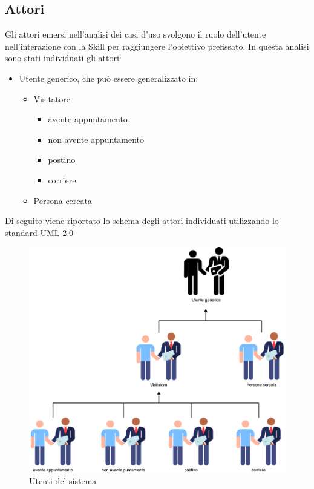 \subsection{Attori}
Gli attori emersi nell'analisi dei casi d’uso svolgono il ruolo dell'utente nell'interazione con la Skill per raggiungere l’obiettivo prefissato. In questa analisi sono stati individuati gli attori:
    \begin{itemize}
        \item Utente generico, che può essere generalizzato in:
            \begin{itemize}
                \item Visitatore
                    \begin{itemize}
                        \item avente appuntamento
                        \item non avente appuntamento
                        \item postino
                        \item corriere
                    \end{itemize}
                \item Persona cercata
        \end{itemize}
    \end{itemize}
Di seguito viene riportato lo schema degli attori individuati utilizzando lo standard UML 2.0
\begin{figure}[H] 
    \centering 
    \includegraphics[width=0.8\columnwidth]{immagini/attori.png}
    \caption{\label{fig:attori}Utenti del sistema}
\end{figure}
